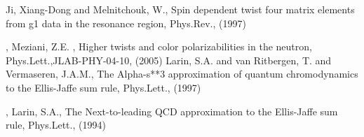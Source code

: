       Ji, Xiang-Dong and Melnitchouk, W., Spin dependent twist four matrix elements from g1 data  in the resonance region,
      Phys.Rev., (1997)

,
      Meziani, Z.E. \etal, Higher twists and color polarizabilities in the  neutron,
      Phys.Lett.,JLAB-PHY-04-10, (2005)
      Larin, S.A. and van Ritbergen, T. and Vermaseren, J.A.M.,
     The Alpha-s**3 approximation of quantum chromodynamics
                        to the Ellis-Jaffe sum rule,
      Phys.Lett., (1997)

,
      Larin, S.A., The Next-to-leading QCD approximation to the Ellis-Jaffe sum rule,
      Phys.Lett., (1994)
